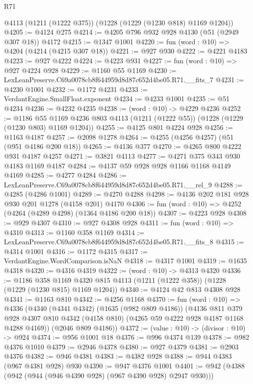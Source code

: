 \begin{lexlean}{R71}
\begin{coremodule}
    @4113
    (@1211 (@1222 @375))
    (@1228 (@1229 (@1230 @818) @1169 @1204))
@4205 := @4124 @275
@4214 := @4205 @796 @932 @928 @4130 (@51 (@2949 @307 @18)) @4172
@4215 := @1347 @1001
@4220 := fun (word : @10) => @4204 (@4214 (@4215 @307 @18))
@4221 := @927 @930
@4222 := @4221 @4183
@4223 := @927 @4222
@4224 := @4223 @931
@4227 := fun (word : @10) => @927 @4224 @928
@4229 := @1160 @55 @1169
@4230 := LexLeanPreserve.C69a0078cb8f644959d8d87c652d4be05.R71.__fits_7
@4231 := @4230 @1001
@4232 := @1172 @4231
@4233 := VerdantEngine.SmallFloat.exponent
@4234 := @4233 @1001
@4235 := @51 @4234
@4236 := @4232 @4235
@4238 := (word : @10) -> @4229 @4236
@4252 := @1186
    @55
    @1169
    @4236
    @803
    @4113
    (@1211 (@1222 @55))
    (@1228 (@1229 (@1230 @803) @1169 @1204))
@4255 := @4125 @801 @4224 @928
@4256 := @1163 @4187
@4257 := @2098 @1278
@4264 := @4255 (@4256 @4257) (@51 (@951 @4186 @200 @18))
@4265 := @4136 @377
@4270 := @4265 @800 @4222 @931 @4187 @4257
@4271 := @3821 @4113
@4277 := @4271 @375 @343 @930 @4183 @1169 @4187
@4284 := @4137 @59 @928 @928 @1166 @1168 @4149 @4169
@4285 := @4277 @4284
@4286 := LexLeanPreserve.C69a0078cb8f644959d8d87c652d4be05.R71.__rel_9
@4288 := @4285 (@4286 @1001)
@4289 := @4270 @4288
@4298 := @4136 @202 @181 @928 @930 @201 @1278 (@4158 @201) @4170
@4306 := fun (word : @10) => @4252 (@4264 (@4289 @4298) (@1364 @4186 @200 @18))
@4307 := @4223 @928
@4308 := @929 @4307
@4310 := @927 @4308 @928
@4311 := fun (word : @10) => @4310
@4313 := @1160 @358 @1169
@4314 := LexLeanPreserve.C69a0078cb8f644959d8d87c652d4be05.R71.__fits_8
@4315 := @4314 @1001
@4316 := @1172 @4315
@4317 := VerdantEngine.WordComparison.isNaN
@4318 := @4317 @1001
@4319 := @1635 @4318
@4320 := @4316 @4319
@4322 := (word : @10) -> @4313 @4320
@4336 := @1186
    @358
    @1169
    @4320
    @815
    @4113
    (@1211 (@1222 @358))
    (@1228 (@1229 (@1230 @815) @1169 @1204))
@4340 := @4124 @42 @813 @4308 @928
@4341 := @1163 @810
@4342 := @4256 @1168
@4370 := fun (word : @10) =>
  @4336
    (@4340
      (@4341 @4342)
      (@1635 (@982 @809 @4186))
      (@4136
        @811
        @379
        @928
        @4307
        @810
        @4342
        (@4158 @810)
        (@4265 @59 @4222 @928 @4187 @1168 @4288 @4169))
      (@2046 @809 @4186))
@4372 := (value : @10) -> (divisor : @10) -> @924
@4374 := @956 @1001 @18
@4376 := @996 @4374 @139
@4378 := @982 @4376 @1010
@4379 := @2946 @4378
@4380 := @927 @4379
@4381 := @2903 @4376
@4382 := @946 @4381
@4383 := @4382 @928
@4388 := @944 @4383 (@967 @4381 @928) @930
@4390 := @947 @4376 @1001
@4401 := @942 (@4388 (@942 (@944 (@946 @4390 @928) (@967 @4390 @928) @2947 @930)))

\end{coremodule}
\end{lexlean}
